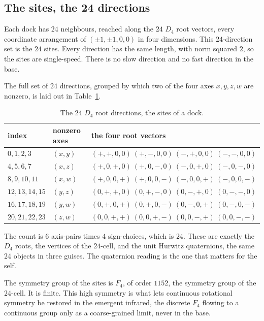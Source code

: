 \subsection{The sites, the 24 directions}

Each dock has $24$ neighbours, reached along the $24$ $D_4$ root vectors, every coordinate arrangement of $(\pm 1, \pm 1, 0, 0)$ in four dimensions. This $24$-direction set is the $24$ sites. Every direction has the same length, with norm squared $2$, so the sites are single-speed. There is no slow direction and no fast direction in the base.

The full set of $24$ directions, grouped by which two of the four axes $x, y, z, w$ are nonzero, is laid out in Table~\ref{tab:directions}.

\begin{table}[ht]
\centering
\begin{tabular}{@{}lll@{}}
\toprule
index & nonzero axes & the four root vectors \\
\midrule
$0,1,2,3$ & $(x,y)$ & $(+,+,0,0)\ (+,-,0,0)\ (-,+,0,0)\ (-,-,0,0)$ \\
$4,5,6,7$ & $(x,z)$ & $(+,0,+,0)\ (+,0,-,0)\ (-,0,+,0)\ (-,0,-,0)$ \\
$8,9,10,11$ & $(x,w)$ & $(+,0,0,+)\ (+,0,0,-)\ (-,0,0,+)\ (-,0,0,-)$ \\
$12,13,14,15$ & $(y,z)$ & $(0,+,+,0)\ (0,+,-,0)\ (0,-,+,0)\ (0,-,-,0)$ \\
$16,17,18,19$ & $(y,w)$ & $(0,+,0,+)\ (0,+,0,-)\ (0,-,0,+)\ (0,-,0,-)$ \\
$20,21,22,23$ & $(z,w)$ & $(0,0,+,+)\ (0,0,+,-)\ (0,0,-,+)\ (0,0,-,-)$ \\
\bottomrule
\end{tabular}
\caption{The $24$ $D_4$ root directions, the sites of a dock.}
\label{tab:directions}
\end{table}

The count is $6$ axis-pairs times $4$ sign-choices, which is $24$. These are exactly the $D_4$ roots, the vertices of the $24$-cell, and the unit Hurwitz quaternions, the same $24$ objects in three guises. The quaternion reading is the one that matters for the self.

The symmetry group of the sites is $F_4$, of order $1152$, the symmetry group of the $24$-cell. It is finite. This high symmetry is what lets continuous rotational symmetry be restored in the emergent infrared, the discrete $F_4$ flowing to a continuous group only as a coarse-grained limit, never in the base.

